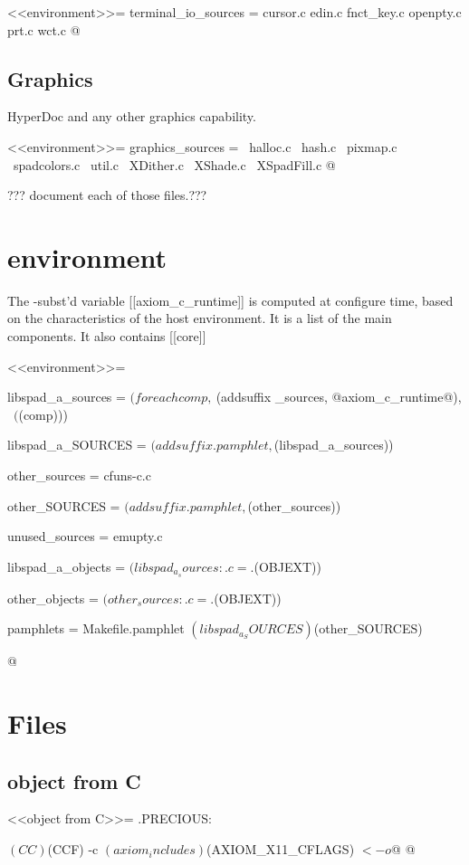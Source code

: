 \documentclass{article}
\begin{document}
<<environment>>=
terminal_io_sources = cursor.c edin.c fnct_key.c openpty.c prt.c wct.c
@


\subsection{Graphics}

HyperDoc and any other graphics capability.

<<environment>>=
graphics_sources = \
		halloc.c \
		hash.c \
		pixmap.c \
		spadcolors.c \
		util.c \
		XDither.c \
		XShade.c \
		XSpadFill.c
@

??? document each of those files.???


\section{environment}

The -subst'd variable [[axiom_c_runtime]] is computed
at configure time, based on the characteristics of the host environment.
It is a list of the main components.  It also contains [[core]]

<<environment>>=

libspad_a_sources = $(foreach comp, \
			$(addsuffix _sources, @axiom_c_runtime@), \
			$($(comp)))

libspad_a_SOURCES = $(addsuffix .pamphlet,$(libspad_a_sources))

other_sources = cfuns-c.c

other_SOURCES = $(addsuffix .pamphlet,$(other_sources))

unused_sources = emupty.c

libspad_a_objects = $(libspad_a_sources:.c=.$(OBJEXT))

other_objects = $(other_sources:.c=.$(OBJEXT))

pamphlets = Makefile.pamphlet $(libspad_a_SOURCES) $(other_SOURCES)

@

\section{Files}

\subsection{object from C}
<<object from C>>=
.PRECIOUS: %

	$(CC) $(CCF) -c $(axiom_includes) $(AXIOM_X11_CFLAGS) $< -o $@
@
\end{document}
